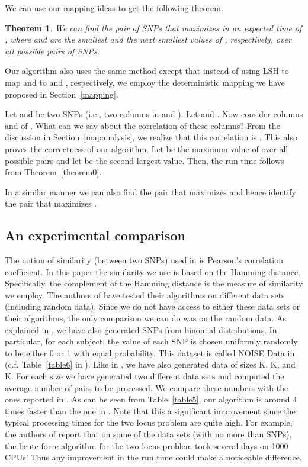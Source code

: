 \documentclass{article}
\newtheorem{theorem}{Theorem}[section]
\theoremstyle{definition}
\theoremstyle{remark}
\begin{document}
We can use our mapping ideas to get the following theorem.

\begin{theorem}\label{theorem6.1}
We can find the pair  of SNPs that maximizes  in an expected time of , where  and  are the smallest and the next smallest values of , respectively, over all possible pairs  of SNPs.
 \end{theorem}

 Our algorithm also uses the same method except that instead of using LSH to map  and  to  and , respectively, we employ the deterministic mapping we have proposed in Section~\ref{mapping}.

Let  and  be two SNPs (i.e., two columns in  and ). Let  and . Now consider columns  and  of . What can we say about the correlation of these columns? From the discussion in Section~\ref{mapanalysis}, we realize that this correlation is . This also proves the correctness of our algorithm. Let  be the maximum value of  over all possible pairs  and let  be the second largest value. Then, the run time follows from Theorem~\ref{theorem0}. 


 In a similar manner we can also find the pair that maximizes  and hence identify the pair that maximizes .
\subsection{An experimental comparison}
The notion of similarity (between two SNPs) used in \cite{PBK11} is Pearson's correlation coefficient. In this paper the similarity we use is based on the Hamming distance.  Specifically, the complement of the Hamming distance is the measure of similarity we employ.
The authors of \cite{PBK11} have tested their algorithms on different data sets (including random data). Since we do not have access to either these data sets or their algorithms, the only comparison we can do was on the random data. As explained in \cite{PBK11}, we have also generated SNPs from binomial distributions. In particular, for each subject, the value of each SNP is chosen uniformly randomly to be either 0 or 1 with equal probability. This dataset is called NOISE Data in \cite{PBK11} (c.f. Table~\ref{table6} in \cite{PBK11}).  Like in \cite{PBK11}, we have also generated data of sizes K, K, and K. For each size we have generated two different data sets and computed the average number of pairs to be processed. We compare these numbers with the ones reported in \cite{PBK11}. As can be seen from Table~\ref{table5}, our algorithm is around 4 times faster than the one in \cite{PBK11}. Note that this a significant improvement since the typical processing times for the two locus problem are quite high. For example, the authors of \cite{PBK11} report that on some of the data sets (with no more than  SNPs), the brute force algorithm for the two locus problem took several days on 1000 CPUs! Thus any improvement in the run time could make a noticeable difference.
\end{document}
